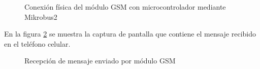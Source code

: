	\begin{figure}[htbp!]
		\centering
		\caption{Conexión física del módulo GSM con microcontrolador mediante Mikrobus2}
		\label{fig:ConexionFisicaGSM}
	\end{figure}
	
En la figura \ref{fig:RecepcionMsj} se muestra la captura de pantalla que contiene el mensaje recibido en el teléfono celular.

	\begin{figure}[htbp!]
		\centering
		\caption{Recepción de mensaje enviado por módulo GSM}
		\label{fig:RecepcionMsj}
	\end{figure}
	
	\clearpage
